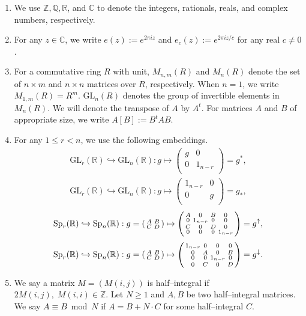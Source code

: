 \documentclass[11pt]{amsart}
\numberwithin{equation}{section}
\newcommand{\mbb}{\mathbb}
\newcommand{\mrm}{\mathrm} %
\newcommand{\smat}[4]{\left( \begin{smallmatrix} #1 & #2 \\ #3 & #4 \\ \end{smallmatrix} \right)}
\newcommand{\tp}[1]{#1^t}
\newcommand{\z}{\mathbb{Z}}
\newcommand{\Q}{\mathbb{Q}}
\newcommand{\complex}{\mathbb{C}}
\begin{document}
\begin{enumerate}
    \item We use $\z, \Q, \mbb R$, and $\complex$ to denote the integers,
rationals, reals, and complex numbers, respectively.

\item For any $z\in \mbb C$, we write $e(z):= e^{2\pi i z} $ and $e_c(z):= e^{2\pi i z/c} $ for any real $c \neq 0$.

\item For a commutative ring $R$ with unit, $M_{n,m}(R)$ and $M_n( R)$ denote the set of $n \times m$  and $n\times n$ matrices over $R$, respectively. When $n=1$, we write $M_{1, m}(R)= R^m$.  $\mrm{GL}_n (R)$ denotes the group of invertible elements in $M_n(R)$. We will denote the transpose of $A$ by $\tp{A}$. For matrices $A$ and $B$ of appropriate size, we write $A[B]:=B^tAB$.

\item  For any $1\le r< n$, we use the following embeddings.
\begin{align}\label{GL-Emb-Up}
    \mrm{GL}_{r}(\mbb R) \hookrightarrow \mrm{GL}_{n}(\mbb R): g\mapsto \smat{g}{0}{0}{1_{n-r}}=g^*,
\end{align}
 \begin{align}\label{GL-Emb-Down}
    \mrm{GL}_{r}(\mbb R) \hookrightarrow \mrm{GL}_{n}(\mbb R): g\mapsto \smat{1_{n-r}}{0}{0}{g}=g_*,
\end{align}
\begin{align}\label{Sp-Emb-Up}
    \mrm{Sp}_{r}(\mbb R) \hookrightarrow \mrm{Sp}_{n}(\mbb R): g=\smat{A}{B}{C}{D}\mapsto \begin{psmallmatrix}
            A&0&B&0\\
            0&1_{n-r}&0&0\\
            C&0&D&0\\
            0&0&0&1_{n-r}
    \end{psmallmatrix}=g^{\uparrow},
\end{align}
\begin{align}\label{Sp-Emb-Down}
    \mrm{Sp}_{r}(\mbb R) \hookrightarrow \mrm{Sp}_{n}(\mbb R): g=\smat{A}{B}{C}{D}\mapsto \begin{psmallmatrix}
            1_{n-r}&0&0&0\\
            0&A&0&B\\
            0&0&1_{n-r}&0\\
            0&C&0&D
    \end{psmallmatrix}=g^{\downarrow}.
\end{align}
\item We say a matrix $M=(M(i,j))$ is half--integral if $2M(i,j),\;M(i,i)\in \z$. Let  $N\ge 1$ and $A, B$ be two half--integral matrices. We say $A\equiv B \bmod N$ if $A=B+N\cdot C$ for some half--integral $C$.
\end{enumerate}
   
\end{document}
